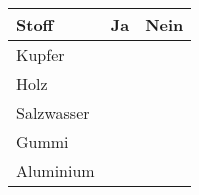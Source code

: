 \begin{enumerate}[label=\arabic*.]
    \begin{tabular}{|p{3cm}|p{2cm}|p{2cm}|}
        \hline
        \textbf{Stoff} & \textbf{Ja} & \textbf{Nein} \\
        \hline
        Kupfer & & \\
        \hline
        Holz & & \\
        \hline
        Salzwasser & & \\
        \hline
        Gummi & & \\
        \hline
        Aluminium & & \\
        \hline
    \end{tabular}

\end{enumerate}
